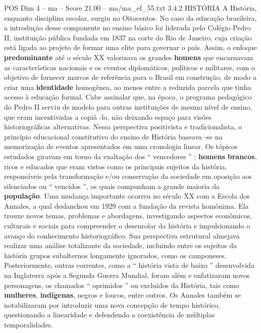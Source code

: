 \begin{textsample}{POS Dim 4 – ma – Score 21.00 – ma/ma\_ef\_55.txt}  \label{ex:f4_pos_052}
3.4.2 HISTÓRIA A História, enquanto disciplina escolar, surgiu no Oitocentos.
No caso da educação brasileira, a introdução desse componente no ensino básico foi liderada pelo Colégio Pedro II, instituição pública fundada em 1837 na corte do Rio de Janeiro, cuja criação está ligada ao projeto de formar uma elite para governar o país.
Assim, o enfoque \textbf{predominante} até o século XX valorizava os grandes \textbf{homens} que encarnavam as características nacionais e os eventos diplomáticos, políticos e militares, com o objetivo de fornecer marcos de referência para o Brasil em construção, de modo a criar uma \textbf{identidade} homogênea, ao menos entre a reduzida parcela que tinha acesso à educação formal.
Cabe assinalar que, na época, o programa pedagógico do Pedro II serviu de modelo para outras instituições de mesmo nível de ensino, que eram incentivadas a copiá -lo, não deixando espaço para visões historiográficas alternativas.
Nessa perspectiva positivista e tradicionalista, o princípio educacional constitutivo do ensino de História baseava -se na memorização de eventos apresentados em uma cronologia linear.
Os tópicos estudados giravam em torno da exaltação dos “ vencedores ” : \textbf{homens} \textbf{brancos}, ricos e educados que eram vistos como os principais sujeitos da história, responsáveis pela transformação e/ou conservação da sociedade em oposição aos silenciados ou “ vencidos ”, os quais compunham a grande maioria da \textbf{população}.
Uma mudança importante ocorreu no século XX com a Escola dos Annales, a qual deslanchou em 1929 com a fundação da revista homônima.
Ela trouxe novos temas, problemas e abordagens, investigando aspectos econômicos, culturais e sociais para compreender o desenrolar da história e impulsionando o avanço do conhecimento historiográfico.
Sua perspectiva estrutural almejava realizar uma análise totalizante da sociedade, incluindo entre os sujeitos da história grupos subalternos longamente ignorados, como os camponeses.
Posteriormente, outras correntes, como a “ história vista de baixo ” desenvolvida na Inglaterra após a Segunda Guerra Mundial, foram além e enfatizaram novos personagens, os chamados “ oprimidos ” ou excluídos da História, tais como \textbf{mulheres}, \textbf{indígenas}, negros e loucos, entre outros.
Os Annales também se notabilizaram por introduzir uma nova concepção de tempo histórico, questionando a linearidade e defendendo a coexistência de múltiplas temporalidades.

\end{textsample}
